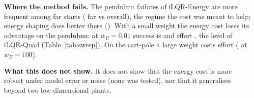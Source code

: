 \begin{table}[t]\centering\caption{Closed-loop mean of the two state-cost terms under iLQR-Quad+Energy at default weights (seeds 0--2, all time steps); ratio is energy over quadratic, computed per run and then averaged over the seeds.}\label{tab:diag}
\end{table}

\textbf{Where the method fails.} The pendulum failures of iLQR-Energy are more frequent among far starts ( far vs  overall), the regime the cost was meant to help; energy shaping does better there (). With a small weight the energy cost loses its advantage on the pendulum: at $w_E=0.01$ success is  and effort , the level of iLQR-Quad (Table~\ref{tab:sweep}). On the cart-pole a large weight costs effort ( at $w_E=100$).

\textbf{What this does not show.} It does not show that the energy cost is more robust under model error or noise (none was tested), nor that it generalises beyond two low-dimensional plants.

